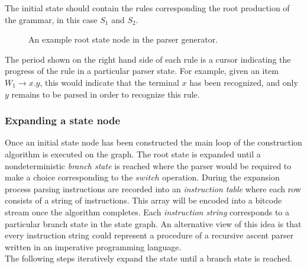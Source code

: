 \documentclass[a4paper,11pt]{article}
\begin{document}
The initial state should contain the rules corresponding the root production of the grammar, in this case $S_1$ and $S_2$.\\

\begin{figure}[!ht]
\centering
{}
\caption{An example root state node in the parser generator.}
\end{figure}

The period shown on the right hand side of each rule is a cursor indicating the progress of the rule in a particular parser state.
For example, given an item $W_1 \rightarrow x . y$, this would indicate that the terminal $x$ has been recognized, and only $y$ remains to be parsed in order to recognize this rule.\\

\subsubsection{Expanding a state node}
Once an initial state node has been constructed the main loop of the construction algorithm is executed on the graph.
The root state is expanded until a nondeterministic \emph{branch state} is reached where the parser would be required to make a choice corresponding to the $switch$ operation.
During the expansion process parsing instructions are recorded into an \emph{instruction table} where each row consists of a string of instructions.
This array will be encoded into a bitcode stream once the algorithm completes.
Each \emph{instruction string} corresponds to a particular branch state in the state graph.
An alternative view of this idea is that every instruction string could represent a procedure of a recursive ascent parser written in an imperative programming language.\\

The following steps iteratively expand the state until a branch state is reached.
\end{document}
